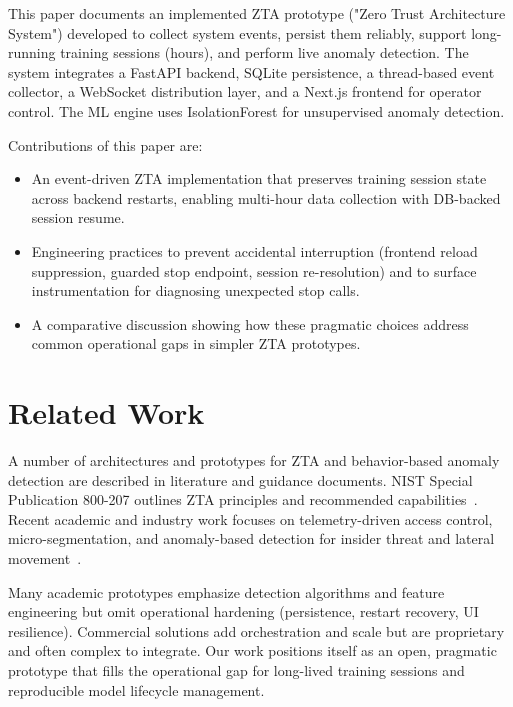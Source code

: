 \documentclass[conference]{IEEEtran}
\begin{document}
This paper documents an implemented ZTA prototype ("Zero Trust Architecture System") developed to collect system events, persist them reliably, support long-running training sessions (hours), and perform live anomaly detection. The system integrates a FastAPI backend, SQLite persistence, a thread-based event collector, a WebSocket distribution layer, and a Next.js frontend for operator control. The ML engine uses IsolationForest for unsupervised anomaly detection.

Contributions of this paper are:
\begin{itemize}[leftmargin=*]
  \item An event-driven ZTA implementation that preserves training session state across backend restarts, enabling multi-hour data collection with DB-backed session resume.
  \item Engineering practices to prevent accidental interruption (frontend reload suppression, guarded stop endpoint, session re-resolution) and to surface instrumentation for diagnosing unexpected stop calls.
  \item A comparative discussion showing how these pragmatic choices address common operational gaps in simpler ZTA prototypes.
\end{itemize}

\section{Related Work}
A number of architectures and prototypes for ZTA and behavior-based anomaly detection are described in literature and guidance documents. NIST Special Publication 800-207 outlines ZTA principles and recommended capabilities~\cite{nist800207}. Recent academic and industry work focuses on telemetry-driven access control, micro-segmentation, and anomaly-based detection for insider threat and lateral movement~\cite{rose2020zero, yu2021survey}.

Many academic prototypes emphasize detection algorithms and feature engineering but omit operational hardening (persistence, restart recovery, UI resilience). Commercial solutions add orchestration and scale but are proprietary and often complex to integrate. Our work positions itself as an open, pragmatic prototype that fills the operational gap for long-lived training sessions and reproducible model lifecycle management.
\end{document}
